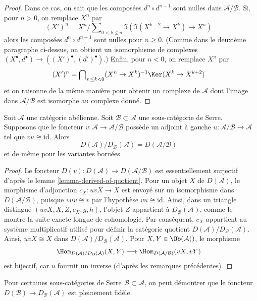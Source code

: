 \begin{proof}
\medskip\noindent
Dans ce cas, on sait que les composées $d^n \circ d^{n - 1}$ sont nulles dans
$\mathcal{A}/\mathcal{B}$. Si, pour $n > 0$, on remplace $X^n$ par
$$
(X')^n = X^n/\sum\nolimits_{0 < k \leq n}
\Im(\Im(X^{k - 2} \to X^k) \to X^n)
$$
alors les composées $d^n \circ d^{n - 1}$ sont nulles pour $n \geq 0$.
(Comme dans le deuxième paragraphe ci-dessus, on obtient un isomorphisme de
complexes
$(X^\bullet, d^\bullet) \to ((X')^\bullet, (d')^\bullet)$.) Enfin, pour
$n < 0$, on remplace $X^n$ par
$$
(X')^n = \bigcap\nolimits_{n \leq k < 0}
(X^n \to X^k)^{-1}\Ker(X^k \to X^{k + 2})
$$
et on raisonne de la même manière pour obtenir un complexe de $\mathcal{A}$
dont l'image dans $\mathcal{A}/\mathcal{B}$ est isomorphe au complexe donné.
\end{proof}

\begin{lemma}
\label{lemma-quotient-by-serre-easy}
Soit $\mathcal{A}$ une catégorie abélienne. Soit
$\mathcal{B} \subset \mathcal{A}$ une sous-catégorie de Serre. Supposons que
le foncteur $v : \mathcal{A} \to \mathcal{A}/\mathcal{B}$ possède un adjoint
à gauche $u : \mathcal{A}/\mathcal{B} \to \mathcal{A}$ tel que
$vu \cong \text{id}$. Alors
$$
D(\mathcal{A})/D_\mathcal{B}(\mathcal{A}) = D(\mathcal{A}/\mathcal{B})
$$
et de même pour les variantes bornées.
\end{lemma}

\begin{proof}
Le foncteur $D(v) : D(\mathcal{A}) \to D(\mathcal{A}/\mathcal{B})$ est
essentiellement surjectif d'après le lemme \ref{lemma-derived-of-quotient}.
Pour un objet $X$ de $D(\mathcal{A})$, le morphisme d'adjonction
$c_X : uvX \to X$ est envoyé sur un isomorphisme dans
$D(\mathcal{A}/\mathcal{B})$, puisque $vuv \cong v$ par l'hypothèse
$vu \cong \text{id}$. Ainsi, dans un triangle distingué
$(uvX, X, Z, c_X, g, h)$, l'objet $Z$ appartient à
$D_\mathcal{B}(\mathcal{A})$, comme le montre la suite exacte longue de
cohomologie. Par conséquent, $c_X$ appartient au système multiplicatif utilisé
pour définir la catégorie quotient
$D(\mathcal{A})/D_\mathcal{B}(\mathcal{A})$. Ainsi,
$uvX \cong X$ dans $D(\mathcal{A})/D_\mathcal{B}(\mathcal{A})$.
Pour $X, Y \in \Ob(\mathcal{A}))$, le morphisme
$$
\Hom_{D(\mathcal{A})/D_\mathcal{B}(\mathcal{A})}(X, Y)
\longrightarrow
\Hom_{D(\mathcal{A}/\mathcal{B})}(vX, vY)
$$
est bijectif, car $u$ fournit un inverse (d'après les remarques précédentes).
\end{proof}

\noindent
Pour certaines sous-catégories de Serre
$\mathcal{B} \subset \mathcal{A}$, on peut démontrer que le foncteur
$D(\mathcal{B}) \to D_\mathcal{B}(\mathcal{A})$ est pleinement fidèle.

